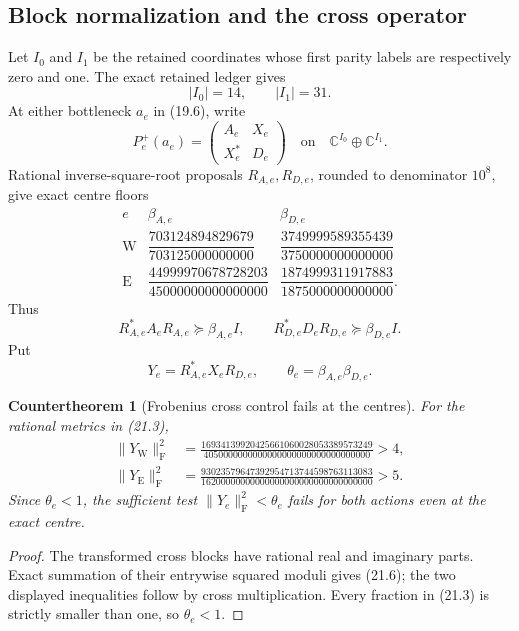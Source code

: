 \documentclass[11pt,oneside]{article}
\newtheorem{countertheorem}[theorem]{Countertheorem}
\theoremstyle{definition}
\theoremstyle{remark}
\begin{document}
\subsection{Block normalization and the cross operator}

Let \(I_0\) and \(I_1\) be the retained coordinates whose first
parity labels are respectively zero and one.  The exact retained
ledger gives
\[
 |I_0|=14,\qquad |I_1|=31.                               \tag{21.1}
\]
At either bottleneck \(a_e\) in (19.6), write
\[
 P_e^+(a_e)=
 \begin{pmatrix}A_e&X_e\\X_e^*&D_e\end{pmatrix}
 \quad\text{on}\quad
 \mathbb C^{I_0}\oplus\mathbb C^{I_1}.                   \tag{21.2}
\]
Rational inverse-square-root proposals \(R_{A,e},R_{D,e}\), rounded
to denominator \(10^8\), give exact centre floors
\[
\begin{array}{c|cc}
e&\beta_{A,e}&\beta_{D,e}\\ \hline
\mathrm W&
\dfrac{703124894829679}{703125000000000}&
\dfrac{3749999589355439}{3750000000000000}\\[5pt]
\mathrm E&
\dfrac{44999970678728203}{45000000000000000}&
\dfrac{1874999311917883}{1875000000000000}.
\end{array}                                              \tag{21.3}
\]
Thus
\[
 R_{A,e}^*A_eR_{A,e}\succeq\beta_{A,e}I,\qquad
 R_{D,e}^*D_eR_{D,e}\succeq\beta_{D,e}I.                 \tag{21.4}
\]
Put
\[
 Y_e=R_{A,e}^*X_eR_{D,e},\qquad
 \theta_e=\beta_{A,e}\beta_{D,e}.                        \tag{21.5}
\]

\begin{countertheorem}[Frobenius cross control fails at the centres]
\label{ctr:newv21-frobenius}
For the rational metrics in (21.3),
\[
\begin{aligned}
\|Y_{\mathrm W}\|_{\mathrm F}^2
&=\frac{16934139920425661060028053389573249}
{4050000000000000000000000000000000}>4,\\
\|Y_{\mathrm E}\|_{\mathrm F}^2
&=\frac{93023579647392954713744598763113083}
{16200000000000000000000000000000000}>5.
\end{aligned}                                            \tag{21.6}
\]
Since \(\theta_e<1\), the sufficient test
\(\|Y_e\|_{\mathrm F}^2<\theta_e\) fails for both actions even at
the exact centre.
\end{countertheorem}

\begin{proof}
The transformed cross blocks have rational real and imaginary
parts.  Exact summation of their entrywise squared moduli gives
(21.6); the two displayed inequalities follow by cross
multiplication.  Every fraction in (21.3) is strictly smaller than
one, so \(\theta_e<1\).
\end{proof}
\end{document}
